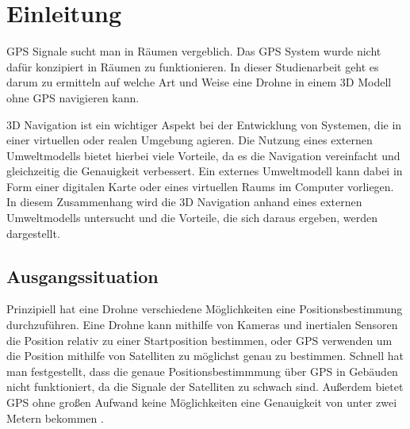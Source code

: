 \chapter{Einleitung}

GPS Signale sucht man in Räumen vergeblich. Das GPS System wurde nicht dafür konzipiert in Räumen zu funktionieren.
In dieser Studienarbeit geht es darum zu ermitteln auf welche Art und Weise eine Drohne in einem 3D Modell ohne GPS navigieren kann.

3D Navigation ist ein wichtiger Aspekt bei der Entwicklung von Systemen, die in einer virtuellen oder realen Umgebung agieren. Die Nutzung eines externen Umweltmodells bietet hierbei viele Vorteile, da es die Navigation vereinfacht und gleichzeitig die Genauigkeit verbessert. Ein externes Umweltmodell kann dabei in Form einer digitalen Karte oder eines virtuellen Raums im Computer vorliegen. In diesem Zusammenhang wird die 3D Navigation anhand eines externen Umweltmodells untersucht und die Vorteile, die sich daraus ergeben, werden dargestellt.



\section{Ausgangssituation}

Prinzipiell hat eine Drohne verschiedene Möglichkeiten eine Positionsbestimmung durchzuführen.
Eine Drohne kann mithilfe von Kameras und inertialen Sensoren die Position relativ zu einer Startposition bestimmen, oder \ac{GPS} verwenden um die Position mithilfe von Satelliten zu möglichst genau zu bestimmen.
Schnell hat man festgestellt, dass die genaue Positionsbestimmmung über GPS in Gebäuden nicht funktioniert, da die Signale der Satelliten zu schwach sind. Außerdem bietet \ac{GPS} ohne großen Aufwand keine Möglichkeiten eine Genauigkeit von unter zwei Metern bekommen
.





